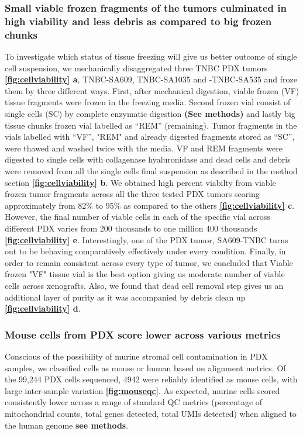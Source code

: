 \subsubsection{Small viable frozen fragments of the tumors culminated in high viability and less debris as compared to big frozen chunks}
To investigate which status of tissue freezing will give us better outcome of single cell suspension, we mechanically disaggregated three TNBC PDX tumors \textbf{\autoref{fig:cellviability} a}, TNBC-SA609, TNBC-SA1035 and -TNBC-SA535 and froze them by three different ways. First, after mechanical digestion, viable frozen (VF) tissue fragments were frozen in the freezing media. Second frozen vial consist of single cells (SC) by complete enzymatic digestion \textbf{(See methods)} and lastly big tissue chunks frozen vial labelled as ``REM'' (remaining). Tumor fragments in the vials labelled with ``VF'', "REM" and already digested fragments stored as ``SC'', were thawed and washed twice with the media. VF and REM fragments were digested to single cells with collagenase hyaluronidase and dead cells and debris were removed from all the single cells final suspension as described in the method section \textbf{\autoref{fig:cellviability} b}. We obtained high percent viabilty from viable frozen tumor fragments across all the three tested PDX tumors scoring approximately from 82\% to 95\% as compared to the others \textbf{\autoref{fig:cellviability} c}. However, the final number of viable cells in each of the specific vial across different PDX varies from 200 thousands to one million 400 thousands  \textbf{\autoref{fig:cellviability} e}. Interestingly, one of the PDX tumor, SA609-TNBC turns out to be behaving comparatively effectively under every condition. 
Finally, in order to  remain consistent across every type of tumor, we concluded that Viable frozen "VF" tissue vial is the best option giving us moderate number of viable cells across xenografts. Also, we found that dead cell removal step gives us an additional layer of purity as it was accompanied by debris clean up \textbf{\autoref{fig:cellviability} d}.

\subsubsection{Mouse cells from PDX score lower across various
metrics}
Conscious of the possibility of murine stromal cell contamination in PDX samples, we classified cells as mouse or human based on alignment metrics. Of the 99,244 PDX cells sequenced, 4942 were reliably identified as mouse cells, with large inter-sample variation \textbf{\autoref{fig:mouseqc}}. As expected, murine cells scored consistently lower across a range of standard QC metrics (percentage of mitochondrial counts, total genes detected, total \ac{UMIs} detected) when aligned to the human genome \textbf{see methods}.

